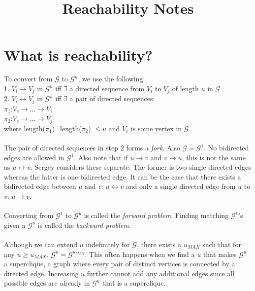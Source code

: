 \documentclass{article}
\theoremstyle{definition}
\begin{document}
\title{Reachability Notes}
\maketitle

\section{What is reachability?}

To convert from $\mathcal{G}$ to $\mathcal{G}^u$, we use the following:
\\
1. $V_i \rightarrow V_j$ in $\mathcal{G}^u$ iff $\exists$ a directed sequence from $V_i$ to $V_j$ of length $u$ in $\mathcal{G}$
\\
2. $V_i \leftrightarrow V_j$ in $\mathcal{G}^u$ iff $\exists$ a pair of directed sequences:
\\
$ \pi_1$:$ V_c \rightarrow ... \rightarrow V_i$
\\
$ \pi_2$:$ V_c \rightarrow ... \rightarrow V_j$
\\
where length($\pi_1$)=length($\pi_2$) $\leq u$ and $V_c$ is some vertex in $\mathcal{G}$ 
\\
\\
The pair of directed sequences in step $2$ forms a \textit{fork}. Also $\mathcal{G}= \mathcal{G}^1$. No bidirected edges are allowed in $\mathcal{G}^1$. Also note that if $u \rightarrow v$ and $v \rightarrow u$, this is not the same as $u \leftrightarrow v$. Sergey considers these separate. The former is two single directed edges whereas the latter is one bidirected edge. It can be the case that there exists a bidirected edge between $u$ and $v$: $u \leftrightarrow v$ and only a single directed edge from $u$ to $v$: $u \rightarrow v$.
\\
\\
Converting from $\mathcal{G}^1$ to $\mathcal{G}^u$ is called the \textit{forward problem}. Finding matching $\mathcal{G}^1$'s given a $\mathcal{G}^u$ is called the \textit{backward problem}. 
\\
\\
Although we can extend $u$ indefinitely for $\mathcal{G}$, there exists a $u_{MAX}$ such that for any $u \geq u_{MAX}$, $\mathcal{G}^u = \mathcal{G}^{u_{MAX}}$. This often happens when we find a $u$ that makes $\mathcal{G}^u$ a superclique, a graph where every pair of distinct vertices is connected by a directed edge. Increasing $u$ further cannot add any additional edges since all possible edges are already in $\mathcal{G}^u$ that is a superclique. 
\end{document}
